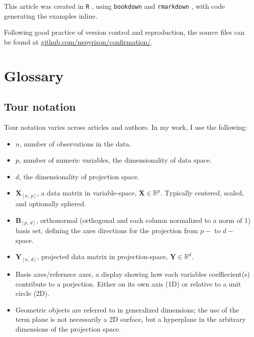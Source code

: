 \documentclass{monashthesis}
\begin{document}
This article was created in \texttt{R} \autocite{r_core_team_r:_2018},
using \texttt{bookdown} \autocite{xie_bookdown:_2016} and
\texttt{rmarkdown} \autocite{xie_r_2018}, with code generating the
examples inline.

Following good practice of version control and reproduction, the source
files can be found at
\href{https://github.com/nspyrison/Confirmation}{github.com/nspyrison/confirmation/}.

\appendix

\chapter{Glossary}\label{ch:glossary}

\section{Tour notation}\label{sec:tour_notation}

Tour notation varies across articles and authors. In my work, I use the
following:

\begin{itemize}
\tightlist
\item
  \(n\), number of observations in the data.
\item
  \(p\), number of numeric variables, the dimensionality of data space.
\item
  \(d\), the dimensionality of projection space.
\item
  \(\textbf{X}_{[n,~p]}\), a data matrix in variable-space,
  \(\textbf{X} \in \mathbb{R}^{p}\). Typically centered, scaled, and
  optionally sphered.
\item
  \(\textbf{B}_{[p,~d]}\), orthonormal (orthogonal and each column
  normalized to a norm of 1) basis set, defining the axes directions for
  the projection from \(p-\) to \(d-\)space.
\item
  \(\textbf{Y}_{[n,~d]}\), projected data matrix in projection-space,
  \(\textbf{Y} \in \mathbb{R}^{d}\).
\item
  Basis axes/refernece axes, a display showing how each variables
  coeffiecient(s) contribute to a porjection. Either on its own axis
  (1D) or relative to a unit circle (2D).
\item
  Geometric objects are referred to in generalized dimensions; the use
  of the term plane is not necessarily a 2D surface, but a hyperplane in
  the arbitrary dimensions of the projection space.
\end{itemize}
\end{document}
